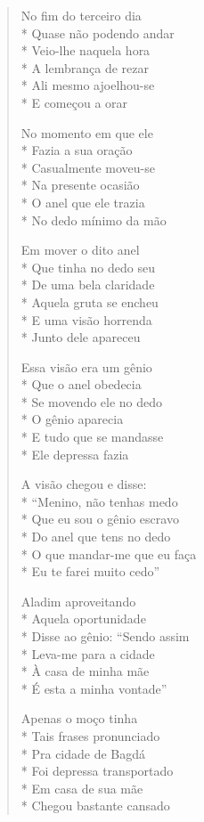 \begin{verse}
No fim do terceiro dia\\*
Quase não podendo andar\\*
Veio-lhe naquela hora\\*
A lembrança de rezar\\*
Ali mesmo ajoelhou-se\\*
E começou a orar

No momento em que ele\\*
Fazia a sua oração\\*
Casualmente moveu-se\\*
Na presente ocasião\\*
O anel que ele trazia\\*
No dedo mínimo da mão

Em mover o dito anel\\*
Que tinha no dedo seu\\*
De uma bela claridade\\*
Aquela gruta se encheu\\*
E uma visão horrenda\\*
Junto dele apareceu

Essa visão era um gênio\\*
Que o anel obedecia\\*
Se movendo ele no dedo\\*
O gênio aparecia\\*
E tudo que se mandasse\\*
Ele depressa fazia

A visão chegou e disse:\\*
``Menino, não tenhas medo\\*
Que eu sou o gênio escravo\\*
Do anel que tens no dedo\\*
O que mandar-me que eu faça\\*
Eu te farei muito cedo''

Aladim aproveitando\\*
Aquela oportunidade\\*
Disse ao gênio: ``Sendo assim\\*
Leva-me para a cidade\\*
À casa de minha mãe\\*
É esta a minha vontade''

Apenas o moço tinha\\*
Tais frases pronunciado\\*
Pra cidade de Bagdá\\*
Foi depressa transportado\\*
Em casa de sua mãe\\*
Chegou bastante cansado


\end{verse}
